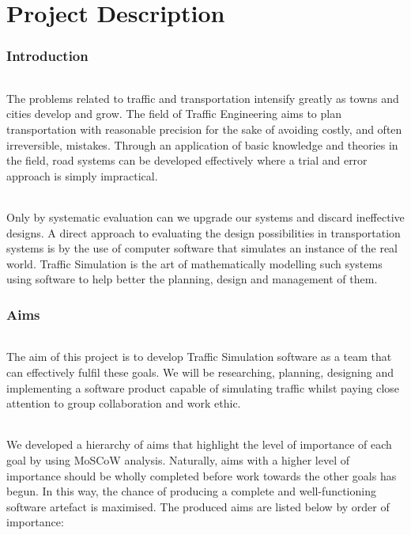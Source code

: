 \documentclass[11pt,a4paper]{article}
\begin{document}
\part*{Project Description}

\section{Introduction}
\paragraph{}
The problems related to traffic and transportation intensify greatly as towns and cities develop and grow. The field of Traffic Engineering aims to plan transportation with reasonable precision for the sake of avoiding costly, and often irreversible, mistakes. Through an application of basic knowledge and theories in the field, road systems can be developed effectively where a trial and error approach is simply impractical.

\paragraph{}
Only by systematic evaluation can we upgrade our systems and discard ineffective designs. A direct approach to evaluating the design possibilities in transportation systems is by the use of computer software that simulates an instance of the real world. Traffic Simulation is the art of mathematically modelling such systems using software to help better the planning, design and management of them.

\section{Aims}
\paragraph{}
The aim of this project is to develop Traffic Simulation software as a team that can effectively fulfil these goals. We will be researching, planning, designing and implementing a software product capable of simulating traffic whilst paying close attention to group collaboration and work ethic.

\paragraph{}
We developed a hierarchy of aims that highlight the level of importance of each goal by using MoSCoW analysis. Naturally, aims with a higher level of importance should be wholly completed before work towards the other goals has begun. In this way, the chance of producing a complete and well-functioning software artefact is maximised. The produced aims are listed below by order of importance:
\end{document}
